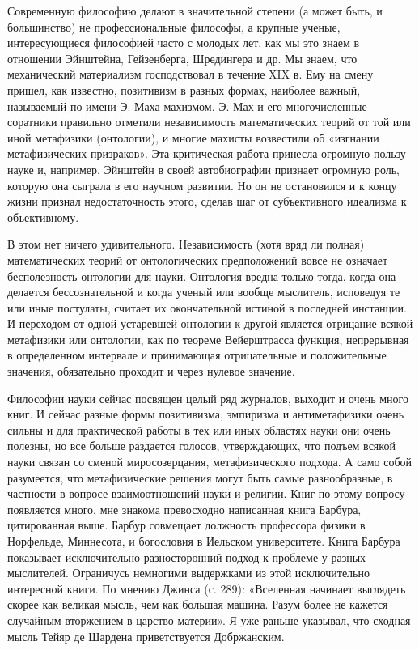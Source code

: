 Современную  философию делают  в значительной  степени (а  может быть,
и  большинство)  не  профессиональные   философы,  а  крупные  ученые,
интересующиеся  философией часто  с молодых  лет, как  мы это  знаем в
отношении  Эйнштейна,  Гейзенберга, Шредингера  и  др.  Мы знаем,  что
механический материализм господствовал  в течение XIX в.  Ему на смену
пришел,  как известно,  позитивизм в  разных формах,  наиболее важный,
называемый  по имени  Э. Маха  махизмом. Э.  Мах и  его многочисленные
соратники  правильно отметили  независимость математических  теорий от
той или  иной метафизики (онтологии),  и многие махисты  возвестили об
«изгнании метафизических  призраков». Эта критическая  работа принесла
огромную  пользу науке  и,  например, Эйнштейн  в своей  автобиографии
признает огромную роль, которую она сыграла в его научном развитии. Но
он  не остановился  и  к концу  жизни  признал недостаточность  этого,
сделав шаг от субъективного идеализма к объективному.

В этом нет  ничего удивительного. Независимость (хотя  вряд ли полная)
математических  теорий   от  онтологических  предположений   вовсе  не
означает бесполезность  онтологии для  науки. Онтология  вредна только
тогда, когда  она делается бессознательной  и когда ученый  или вообще
мыслитель, исповедуя  те или иные постулаты,  считает их окончательной
истиной  в  последней  инстанции.  И  переходом  от  одной  устаревшей
онтологии к другой является отрицание всякой метафизики или онтологии,
как  по  теореме  Вейерштрасса  функция,  непрерывная  в  определенном
интервале  и  принимающая   отрицательные  и  положительные  значения,
обязательно проходит и через нулевое значение.

Философии  науки  сейчас  посвящен   целый  ряд  журналов,  выходит  и
очень  много книг.  И  сейчас разные  формы  позитивизма, эмпиризма  и
антиметафизики очень сильны  и для практической работы в  тех или иных
областях науки  они очень  полезны, но  все больше  раздается голосов,
утверждающих, что подъем всякой науки связан со сменой миросозерцания,
метафизического подхода.  А само собой разумеется,  что метафизические
решения  могут  быть  самые   разнообразные,  в  частности  в  вопросе
взаимоотношений  науки и  религии.  Книг по  этому вопросу  появляется
много, мне знакома превосходно  написанная книга Барбура, цитированная
выше.  Барбур  совмещает  должность  профессора  физики  в  Норфельде,
Миннесота,  и  богословия  в   Иельском  университете.  Книга  Барбура
показывает  исключительно разносторонний  подход к  проблеме у  разных
мыслителей.  Ограничусь  немногими  выдержками из  этой  исключительно
интересной  книги.  По мнению  Джинса  (с.  289): «Вселенная  начинает
выглядеть  скорее как  великая мысль,  чем как  большая машина.  Разум
более  не  кажется случайным  вторжением  в  царство материи».  Я  уже
раньше  указывал, что  сходная мысль  Тейяр де  Шардена приветствуется
Добржанским.

